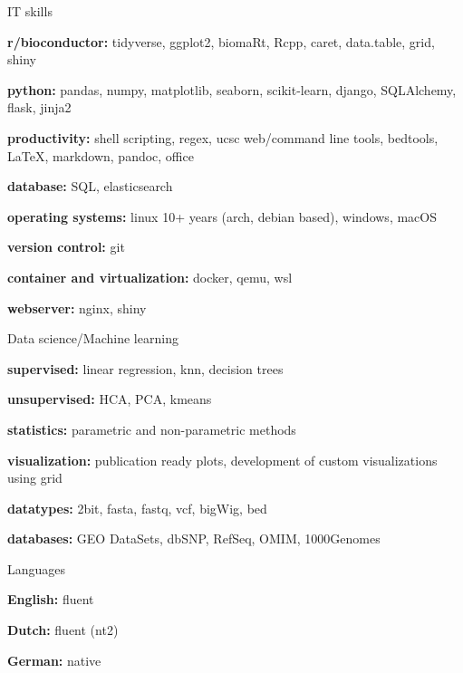 

\begin{cvskills}
  \cvskill
    {IT skills} %
    {
      \begin{cvitems}
        \item {\textbf{r/bioconductor:} tidyverse, ggplot2, biomaRt, Rcpp, caret, data.table, grid, shiny}
        \item {\textbf{python:} pandas, numpy, matplotlib, seaborn, scikit-learn, django, SQLAlchemy, flask, jinja2}
        \item {\textbf{productivity:} shell scripting, regex, ucsc web/command line tools, bedtools, LaTeX, \newline markdown, pandoc, office}
        \item {\textbf{database:} SQL, elasticsearch}
        \item {\textbf{operating systems:} linux 10+ years (arch, debian based), windows, macOS}
        \item {\textbf{version control:} git}
        \item {\textbf{container and virtualization:} docker, qemu, wsl}
        \item {\textbf{webserver:} nginx, shiny}
      \end{cvitems}
      }
      
  \cvskill
    {Data science/Machine learning}%
    {
      \begin{cvitems}
        \item {\textbf{supervised:} linear regression, knn, decision trees}
        \item {\textbf{unsupervised:} HCA, PCA, kmeans}
        \item {\textbf{statistics:} parametric and non-parametric methods}
        \item {\textbf{visualization:} publication ready plots, development of custom visualizations using grid}
        \item {\textbf{datatypes:} 2bit, fasta, fastq, vcf, bigWig, bed}
        \item {\textbf{databases:} GEO DataSets, dbSNP, RefSeq, OMIM, 1000Genomes}
      \end{cvitems}
    }
  \cvskill
    {Languages} %
    {
      \begin{cvitems}
        \item {\textbf{English:} fluent}
        \item {\textbf{Dutch:} fluent (nt2)}
        \item {\textbf{German:} native}
      \end{cvitems}
    }
\end{cvskills}
